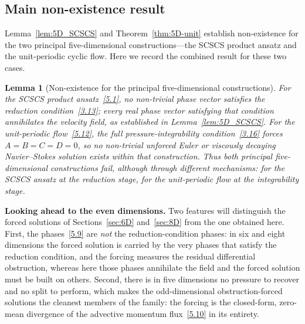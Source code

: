 \documentclass[11pt]{jfm}
\newtheorem{lemma}{Lemma}[section]
\numberwithin{equation}{section}
\begin{document}
\subsection{Main non-existence result}
Lemma~\ref{lem:5D_SCSCS} and Theorem~\ref{thm:5D-unit} establish non-existence for the two principal
five-dimensional constructions---the SCSCS product ansatz and the unit-periodic cyclic flow.
Here we record the combined result for these two cases.

\begin{lemma}[Non-existence for the principal five-dimensional constructions]
\label{lem:5D_main}
For the SCSCS product ansatz~\eqref{5.1}, no non-trivial phase vector satisfies the
reduction condition~\eqref{3.13}; every real phase vector satisfying that condition
annihilates the velocity field, as established in Lemma~\ref{lem:5D_SCSCS}. For the
unit-periodic flow~\eqref{5.12}, the full pressure-integrability condition~\eqref{3.16}
forces $A=B=C=D=0$, so no non-trivial unforced Euler or viscously decaying Navier--Stokes
solution exists within that construction. Thus both principal five-dimensional
constructions fail, although through different mechanisms: for the SCSCS ansatz at the reduction
stage, for the unit-periodic flow at the integrability stage.
\end{lemma}

\medskip
\medskip
\noindent\textbf{Looking ahead to the even dimensions.} Two features will distinguish the forced
solutions of Sections~\ref{sec:6D} and~\ref{sec:8D} from the one obtained here. First, the phases~\eqref{5.9} are
\emph{not} the reduction-condition phases: in six and eight dimensions the forced solution is
carried by the very phases that satisfy the reduction condition, and the forcing measures the
residual differential obstruction, whereas here those phases annihilate the field and the forced
solution must be built on others. Second, there is in five dimensions no pressure to recover and no split to perform, which makes the odd-dimensional
obstruction-forced solutions the cleanest members of the family: the forcing is the closed-form,
zero-mean divergence of the advective momentum flux~\eqref{5.10} in its entirety.
\end{document}
